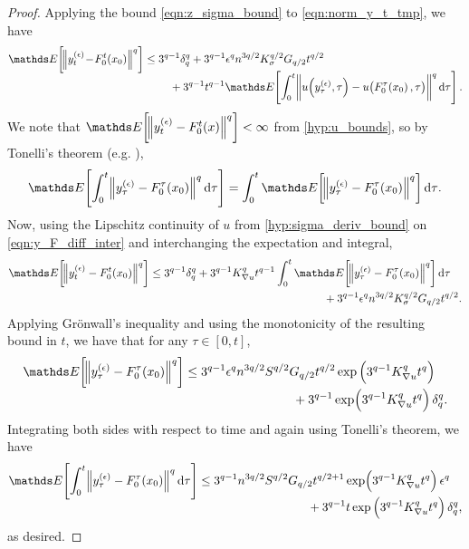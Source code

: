 \begin{proof}
	Applying the bound \cref{eqn:z_sigma_bound} to \cref{eqn:norm_y_t_tmp}, we have
	\begin{equation}\label{eqn:y_F_diff_inter}
		\avg{\norm{y_t^{(\epsilon)}\!-\!F_0^t\!\left(x_0\right)}^q} \leq \begin{multlined}[t]
			3^{q-1}\delta_q^q + 3^{q-1}\epsilon^q n^{3q/2}K_{\sigma}^{q/2} G_{q/2} t^{q/2} \\
			+ 3^{q-1}t^{q-1}\avg{\int_0^{t}{\norm{u\!\left(y_\tau^{(\epsilon)}, \tau\right) - u\!\left(F_0^{\tau}\!\left(x_0\right), \tau\right)}}^q\dif\tau}.
		\end{multlined}
	\end{equation}
	We note that \(\avg{\norm{y_t^{(\epsilon)} - F_0^t\!\left(x\right)}^q} < \infty\) from \ref{hyp:u_bounds}, so by Tonelli's theorem (e.g. \citet[Thm. 2.3.9]{Bremaud_2020_ProbabilityTheoryStochastic}),
	\begin{equation*}
		\avg{\int_0^{t}{\norm{y_\tau^{(\epsilon)} - F_0^\tau\!\left(x_0\right)}^q\dif\tau}} = \int_0^{t}{\avg{\norm{y_\tau^{(\epsilon)} - F_0^\tau\!\left(x_0\right)}^q}\dif\tau}.
		\label{eqn:y_tonelli}
	\end{equation*}
	Now, using the Lipschitz continuity of \(u \) from \ref{hyp:sigma_deriv_bound} on \cref{eqn:y_F_diff_inter} and interchanging the expectation and integral,
	\[
		\avg{\norm{y_t^{(\epsilon)} - F_0^t\!\left(x_0\right)}^q} \leq \begin{multlined}[t]
			3^{q-1}\delta_q^q + 3^{q-1} K_{\nabla u}^q t^{q-1} \int_0^{t}{\avg{\norm{y_\tau^{(\epsilon)} - F_0^{\tau}\!\left(x_0\right)}^q}\dif\tau} \\
			+ 3^{q-1}\epsilon^q n^{3q/2}K_{\sigma}^{q/2} G_{q/2} t^{q/2}.
		\end{multlined}
	\]
	Applying Gr\"{o}nwall's inequality and using the monotonicity of the resulting bound in \(t\), we have that for any \(\tau \in [0,t]\),
	\[
		\avg{\norm{y_\tau^{(\epsilon)} - F_0^\tau\!\left(x_0\right)}^q}  \leq \begin{multlined}[t]
			3^{q-1}\epsilon^q n^{3q/2}S^{q/2} G_{q/2} t^{q/2}\exp\left(3^{q-1} K_{\nabla u}^q t^q\right) \\
			+ 3^{q-1}\exp\!\left(3^{q-1} K_{\nabla u}^q t^q\right)\delta_q^q .
		\end{multlined}
	\]
	Integrating both sides with respect to time
	and again using Tonelli's theorem, we have
	\begin{align*}
		\avg{\int_0^t{\norm{y_\tau^{(\epsilon)} - F_0^\tau\!\left(x_0\right)}^q\dif\tau}} \leq \begin{multlined}[t]
			                                                                                       3^{q-1}n^{3q/2}S^{q/2} G_{q/2} t^{q/2 + 1}\exp\!\left(3^{q-1} K_{\nabla u}^q t^q\right)\epsilon^q  \\
			                                                                                       + 3^{q-1}t\exp\left(3^{q-1} K_{\nabla u}^q t^q\right)\delta_q^q ,
		                                                                                       \end{multlined}
	\end{align*}
	as desired.
\end{proof}

